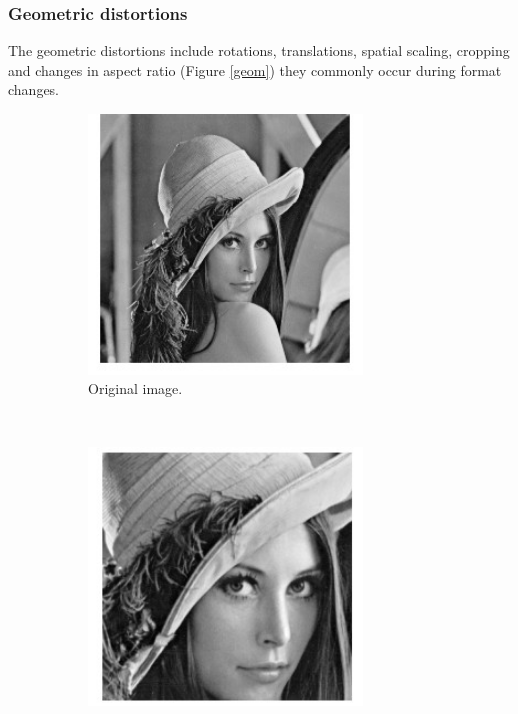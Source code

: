\subsubsection{Geometric distortions}
The geometric distortions include rotations, translations, spatial scaling, cropping and changes in aspect ratio (Figure \ref{geom}) they commonly occur during format changes.

\begin{figure}[h!]
\centering
\begin{subfigure}[]{0.4\textwidth}
\centering
\includegraphics[width=0.8\textwidth]{./img/lena3.jpg}
\caption{\small{Original image.}}
\label{fig:geom1}
\end{subfigure}%
~ %
\begin{subfigure}[]{0.4\textwidth}
\centering
\includegraphics[width= 0.8\textwidth]{./img/crop.jpg}

\end{subfigure}
\end{figure}
